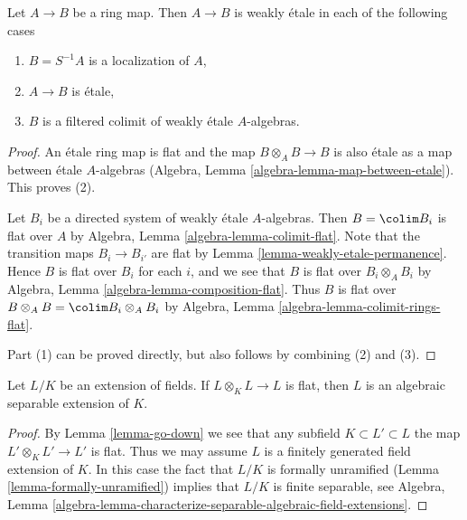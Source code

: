 \begin{lemma}
\label{lemma-when-weakly-etale}
Let $A \to B$ be a ring map. Then $A \to B$ is weakly \'etale in each
of the following cases
\begin{enumerate}
\item $B = S^{-1}A$ is a localization of $A$,
\item $A \to B$ is \'etale,
\item $B$ is a filtered colimit of weakly \'etale $A$-algebras.
\end{enumerate}
\end{lemma}

\begin{proof}
An \'etale ring map is flat and the map $B \otimes_A B \to B$ is
also \'etale as a map between \'etale $A$-algebras
(Algebra, Lemma \ref{algebra-lemma-map-between-etale}).
This proves (2).

\medskip\noindent
Let $B_i$ be a directed system of weakly \'etale $A$-algebras.
Then $B = \colim B_i$ is flat over $A$ by
Algebra, Lemma \ref{algebra-lemma-colimit-flat}.
Note that the transition maps $B_i \to B_{i'}$ are flat
by Lemma \ref{lemma-weakly-etale-permanence}.
Hence $B$ is flat over $B_i$ for each $i$, and we see that $B$ is flat
over $B_i \otimes_A B_i$ by
Algebra, Lemma \ref{algebra-lemma-composition-flat}.
Thus $B$ is flat over $B \otimes_A B = \colim B_i \otimes_A B_i$
by Algebra, Lemma \ref{algebra-lemma-colimit-rings-flat}.

\medskip\noindent
Part (1) can be proved directly, but also follows by combining
(2) and (3).
\end{proof}

\begin{lemma}
\label{lemma-absolutely-flat-fields}
Let $L/K$ be an extension of fields. If $L \otimes_K L \to L$
is flat, then $L$ is an algebraic separable extension of $K$.
\end{lemma}

\begin{proof}
By Lemma \ref{lemma-go-down} we see that any subfield
$K \subset L' \subset L$ the map $L' \otimes_K L' \to L'$ is flat.
Thus we may assume $L$ is a finitely generated field extension of $K$.
In this case the fact that $L/K$ is formally unramified
(Lemma \ref{lemma-formally-unramified})
implies that $L/K$ is finite separable, see Algebra, Lemma
\ref{algebra-lemma-characterize-separable-algebraic-field-extensions}.
\end{proof}

